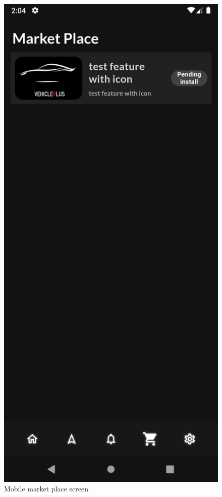 \documentclass[
12pt,
oneside, 
onehalfspacing, 
nolistspacing, 
parskip, 
chapterinoneline, 
]{AASTCOMPUTER}
\begin{document}
 \begin{figure}[!ht]
	\centering
	\includegraphics[scale=0.15]{Figures/mobileApp/5.png}
  	\caption{Mobile market place screen}
  	\label{fig:Mobile market place screen}
\end{figure}
\end{document}
